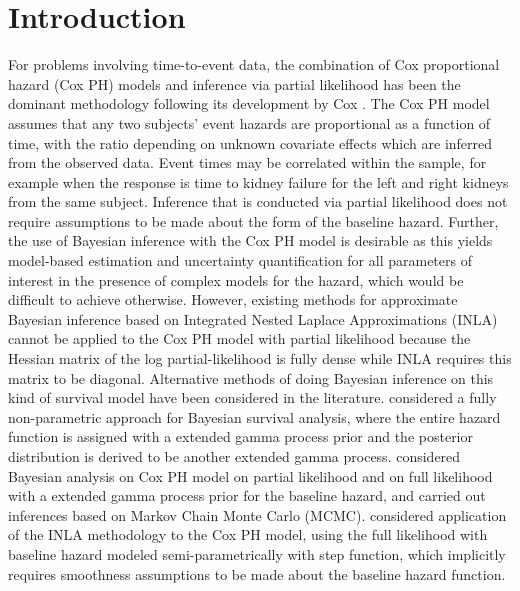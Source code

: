 \documentclass[ba]{imsart}
\begin{document}
\section{Introduction}\label{sec1}
For problems involving time-to-event data, the combination of Cox proportional hazard (Cox PH) models and inference via partial likelihood has been the dominant methodology following its development by Cox \citep{coxph}. The Cox PH model assumes that any two subjects' event hazards are proportional as a function of time, with the ratio depending on unknown covariate effects which are inferred from the observed data. Event times may be correlated within the sample, for example when the response is time to kidney failure for the left and right kidneys from the same subject. Inference that is conducted via partial likelihood does not require assumptions to be made about the form of the baseline hazard. Further, the use of Bayesian inference with the Cox PH model is desirable as this yields model-based estimation and uncertainty quantification for all parameters of interest in the presence of complex models for the hazard, which would be difficult to achieve otherwise. However, existing methods for approximate Bayesian inference based on Integrated Nested Laplace Approximations (INLA) \citep{inla} cannot be applied to the Cox PH model with partial likelihood because the Hessian matrix of the log partial-likelihood is fully dense while INLA requires this matrix to be diagonal. Alternative methods of doing Bayesian inference on this kind of survival model have been considered in the literature. \cite{BayesianNonpara} considered a fully non-parametric approach for Bayesian survival analysis, where the entire hazard function is assigned with a extended gamma process prior and the posterior distribution is derived to be another extended gamma process. \cite{BayesianPartialMCMC} considered Bayesian analysis on Cox PH model on partial likelihood and on full likelihood with a extended gamma process prior for the baseline hazard, and carried out inferences based on Markov Chain Monte Carlo (MCMC). \cite{inlacoxph} considered application of the INLA methodology to the Cox PH model, using the full likelihood with baseline hazard modeled semi-parametrically with step function, which implicitly requires smoothness assumptions to be made about the baseline hazard function.
\end{document}
